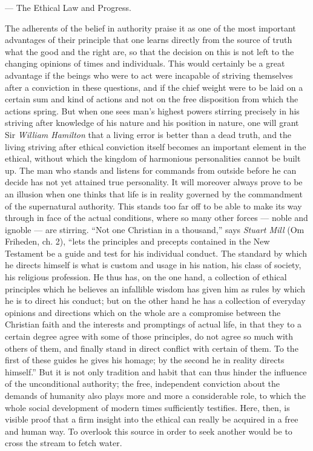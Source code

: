 \documentclass[12pt,a4paper,openany]{book}
\newcommand{\opage}[1]{\marginnote{\footnotesize\textit{[#1]}}}
\newcommand{\chap}[1]{\clearpage\addcontentsline{toc}{chapter}{#1}\vspace*{2em}\begin{center}{\large #1}\end{center}\medskip}
\begin{document}
\chap{--- The Ethical Law and Progress.}
\opage{87}The adherents of the belief in authority praise it as one of the
most important advantages of their principle that one learns directly from
the source of truth what the good and the right are, so that the decision
on this is not left to the changing opinions of times and individuals.
This would certainly be a great advantage if the beings who were to act
were incapable of striving themselves after a conviction in these
questions, and if the chief weight were to be laid on a certain sum and
kind of actions and not on the free disposition from which the actions
spring. But when one sees man's highest powers stirring precisely in his
striving after knowledge of his nature and his position in nature, one
will grant Sir \emph{William Hamilton} that a living error is better than a
dead truth, and the living striving after ethical conviction itself
becomes an important element in the ethical, without which the kingdom of
harmonious \opage{88}personalities cannot be built up. The man who stands
and listens for commands from outside before he can decide has not yet
attained true personality. It will moreover always prove to be an illusion
when one thinks that life is in reality governed by the commandment of the
supernatural authority. This stands too far off to be able to make its way
through in face of the actual conditions, where so many other forces ---
noble and ignoble --- are stirring. ``Not one Christian in a thousand,''
says \emph{Stuart Mill} (Om Friheden, ch. 2), ``lets the principles and
precepts contained in the New Testament be a guide and test for his
individual conduct. The standard by which he directs himself is what is
custom and usage in his nation, his class of society, his religious
profession. He thus has, on the one hand, a collection of ethical
principles which he believes an infallible wisdom has given him as rules
by which he is to direct his conduct; but on the other hand he has a
collection of everyday opinions and directions which on the whole are a
compromise between the Christian faith and the interests and promptings of
actual life, in that they to a certain degree agree with some of those
principles, do not agree so much with others of them, and finally stand in
direct conflict with certain of them. To the first of these guides he
gives his homage; by the second he in reality directs himself.'' But it is
not only tradition and habit that can thus hinder the \opage{89}influence
of the unconditional authority; the free, independent conviction about the
demands of humanity also plays more and more a considerable role, to which
the whole social development of modern times sufficiently testifies. Here,
then, is visible proof that a firm insight into the ethical can really be
acquired in a free and human way. To overlook this source in order to seek
another would be to cross the stream to fetch water.
\end{document}
